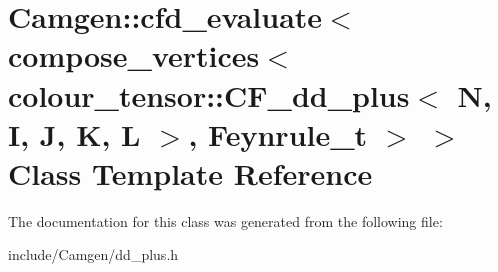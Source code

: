 \hypertarget{a00050}{\section{Camgen\-:\-:cfd\-\_\-evaluate$<$ compose\-\_\-vertices$<$ colour\-\_\-tensor\-:\-:C\-F\-\_\-dd\-\_\-plus$<$ N, I, J, K, L $>$, Feynrule\-\_\-t $>$ $>$ Class Template Reference}
\label{a00050}
}


The documentation for this class was generated from the following file\-:\begin{DoxyCompactItemize}
\item 
include/\-Camgen/dd\-\_\-plus.\-h\end{DoxyCompactItemize}
